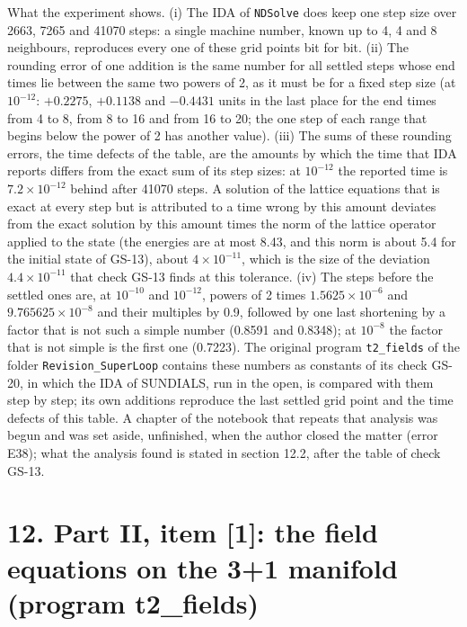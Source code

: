 \documentclass[
  10pt,
]{article}
\begin{document}
What the experiment shows. (i) The IDA of \texttt{NDSolve} does keep one
step size over 2663, 7265 and 41070 steps: a single machine number,
known up to 4, 4 and 8 neighbours, reproduces every one of these grid
points bit for bit. (ii) The rounding error of one addition is the same
number for all settled steps whose end times lie between the same two
powers of 2, as it must be for a fixed step size (at \(10^{-12}\):
\(+0.2275\), \(+0.1138\) and \(-0.4431\) units in the last place for the
end times from 4 to 8, from 8 to 16 and from 16 to 20; the one step of
each range that begins below the power of 2 has another value). (iii)
The sums of these rounding errors, the time defects of the table, are
the amounts by which the time that IDA reports differs from the exact
sum of its step sizes: at \(10^{-12}\) the reported time is
\(7.2\times10^{-12}\) behind after 41070 steps. A solution of the
lattice equations that is exact at every step but is attributed to a
time wrong by this amount deviates from the exact solution by this
amount times the norm of the lattice operator applied to the state (the
energies are at most 8.43, and this norm is about 5.4 for the initial
state of GS-13), about \(4\times10^{-11}\), which is the size of the
deviation \(4.4\times10^{-11}\) that check GS-13 finds at this
tolerance. (iv) The steps before the settled ones are, at \(10^{-10}\)
and \(10^{-12}\), powers of 2 times \(1.5625\times10^{-6}\) and
\(9.765625\times10^{-8}\) and their multiples by 0.9, followed by one
last shortening by a factor that is not such a simple number (0.8591 and
0.8348); at \(10^{-8}\) the factor that is not simple is the first one
(0.7223). The original program \texttt{t2\_fields} of the folder
\texttt{Revision\_SuperLoop} contains these numbers as constants of its
check GS-20, in which the IDA of SUNDIALS, run in the open, is compared
with them step by step; its own additions reproduce the last settled
grid point and the time defects of this table. A chapter of the notebook
that repeats that analysis was begun and was set aside, unfinished, when
the author closed the matter (error E38); what the analysis found is
stated in section 12.2, after the table of check GS-13.

\hypertarget{part-ii-item-1-the-field-equations-on-the-31-manifold-program-t2_fields}{%
\section{12. Part II, item {[}1{]}: the field equations on the 3+1
manifold (program
t2\_fields)}\label{part-ii-item-1-the-field-equations-on-the-31-manifold-program-t2_fields}}
\end{document}
